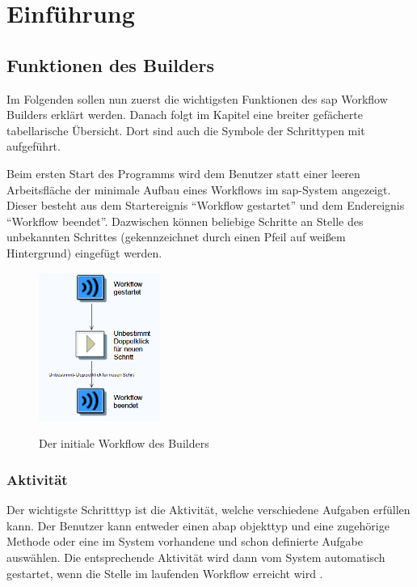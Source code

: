 \section{Einführung}

\subsection{Funktionen des Builders}
\label{sec:builder-funktionen}
Im Folgenden sollen nun zuerst die wichtigsten Funktionen des \gls{sap} Workflow Builders erklärt werden. Danach folgt im Kapitel  eine breiter gefächerte tabellarische Übersicht. Dort sind auch die Symbole der Schrittypen mit aufgeführt. 

Beim ersten Start des Programms wird dem Benutzer statt einer leeren Arbeitsfläche der minimale Aufbau eines Workflows im \gls{sap}-System angezeigt. Dieser besteht aus dem Startereignis "`Workflow gestartet"' und dem Endereignis "`Workflow beendet"'. Dazwischen können beliebige Schritte an Stelle des unbekannten Schrittes (gekennzeichnet durch einen Pfeil auf weißem Hintergrund) eingefügt werden.

\begin{figure}[H]
	\begin{center}
	\includegraphics[width=150px]{grafiken/wf-builder_new-wf.png}
	\caption{Der initiale Workflow des Builders}
	\vspace{-10pt}
	\label{abb:workflow-easy}
	\end{center}
\end{figure}

\subsubsection{Aktivität}
Der wichtigste Schritttyp ist die Aktivität, welche verschiedene Aufgaben erfüllen kann. Der Benutzer kann entweder einen \gls{abap} \gls{objekttyp} und eine zugehörige Methode oder eine im System vorhandene und schon definierte Aufgabe auswählen. Die entsprechende Aktivität wird dann vom System automatisch gestartet, wenn die Stelle im laufenden Workflow erreicht wird \cite{SAPHelp}.

